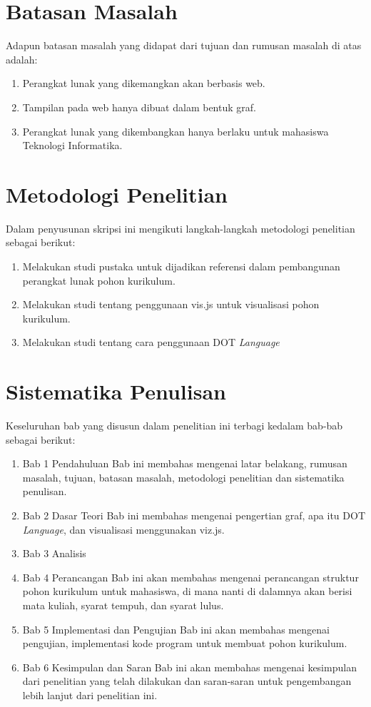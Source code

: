 \section{Batasan Masalah}
\label{sec:batasan}
Adapun batasan masalah yang didapat dari tujuan dan rumusan masalah di atas adalah:

\begin{enumerate}
\item Perangkat lunak yang dikemangkan akan berbasis web.
\item Tampilan pada web hanya dibuat dalam bentuk graf.
\item Perangkat lunak yang dikembangkan hanya berlaku untuk mahasiswa Teknologi Informatika.
\end{enumerate}

\section{Metodologi Penelitian}
\label{sec:Metodologi Penelitian}
Dalam penyusunan skripsi ini mengikuti langkah-langkah metodologi penelitian sebagai berikut:

\begin{enumerate}
\item Melakukan studi pustaka untuk dijadikan referensi dalam pembangunan perangkat lunak pohon kurikulum.
\item Melakukan studi tentang penggunaan vis.js untuk visualisasi pohon kurikulum.
\item Melakukan studi tentang cara penggunaan DOT \textit{Language}
\end{enumerate}

\section{Sistematika Penulisan}
\label{sec:Sistematika Penulisan}
Keseluruhan bab yang disusun dalam penelitian ini terbagi kedalam bab-bab sebagai berikut:
\begin{enumerate}
\item Bab 1 Pendahuluan
Bab ini membahas mengenai latar belakang, rumusan masalah, tujuan, batasan masalah,
metodologi penelitian dan sistematika penulisan.
\item Bab 2 Dasar Teori
Bab ini membahas mengenai pengertian graf, apa itu DOT \textit{Language}, dan visualisasi menggunakan viz.js.
\item Bab 3 Analisis 

\item Bab 4 Perancangan 
Bab ini akan membahas mengenai perancangan struktur pohon kurikulum untuk mahasiswa, di mana nanti di dalamnya akan berisi mata kuliah, syarat tempuh, dan syarat lulus. 
\item Bab 5 Implementasi dan Pengujian
Bab ini akan membahas mengenai pengujian, implementasi kode program untuk membuat pohon kurikulum.
\item Bab 6 Kesimpulan dan Saran
Bab ini akan membahas mengenai kesimpulan dari penelitian yang telah dilakukan dan
saran-saran untuk pengembangan lebih lanjut dari penelitian ini.
\end{enumerate}